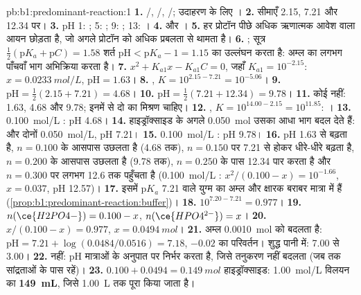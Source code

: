 \begin{solution}{pb:b1:predominant-reaction:1}
\textbf{1.} /, /,
/; उदाहरण के लिए ।
\textbf{2.} सीमाएँ 2.15, 7.21 और 12.34 पर।
\textbf{3.} pH 1: ; 5: ; 9: ; 13:
।
\textbf{4.}  और ।
\textbf{5.} हर प्रोटॉन पीछे अधिक ऋणात्मक आवेश वाला आयन छोड़ता है, जो
अगले प्रोटॉन को अधिक प्रबलता से थामता है।
\textbf{6.} ; सूत्र
$\frac12(\mathrm{p}K_a + \mathrm{p}C) = 1.58$ शर्त $\mathrm{pH} <
\mathrm{p}K_a - 1 = 1.15$ का उल्लंघन करता है: अम्ल का लगभग पाँचवाँ भाग अभिक्रिया करता है।
\textbf{7.} $x^2 + K_{a1}x - K_{a1}C = 0$, जहाँ $K_{a1} = 10^{-2.15}$: $x =
\qty{0.0233}{mol/L}$, $\mathrm{pH} = 1.63$।
\textbf{8.} , $K = 10^{2.15 - 7.21} =
10^{-5.06}$।
\textbf{9.} $\mathrm{pH} = \frac12(2.15 + 7.21) = 4.68$।
\textbf{10.} $\mathrm{pH} = \frac12(7.21 + 12.34) = 9.78$।
\textbf{11.} कोई नहीं: 1.63, 4.68 और 9.78; इनमें से दो का मिश्रण
चाहिए।
\textbf{12.} , $K = 10^{14.00 - 2.15} =
10^{11.85}$: ।
\textbf{13.} \qty{0.100}{mol/L} : pH 4.68।
\textbf{14.} हाइड्रॉक्साइड के अगले \qty{0.050}{mol} उसका आधा भाग बदल देते हैं:
 और  दोनों \qty{0.050}{mol/L}, pH 7.21।
\textbf{15.} \qty{0.100}{mol/L} : pH 9.78।
\textbf{16.} pH 1.63 से बढ़ता है, $n = 0.100$ के आसपास उछलता है (4.68 तक),
$n = 0.150$ पर 7.21 से होकर धीरे-धीरे बढ़ता है, $n = 0.200$ के आसपास उछलता है (9.78 तक),
$n = 0.250$ के पास 12.34 पार करता है और $n = 0.300$ पर लगभग 12.6 तक पहुँचता है (\qty{0.100}{mol/L} : $x^2/(0.100 - x) = 10^{-1.66}$, $x = 0.037$, pH 12.57)।
\textbf{17.} इसमें $\mathrm{p}K_a$ 7.21 वाले युग्म का अम्ल और क्षारक बराबर
मात्रा में हैं (\cref{prop:b1:predominant-reaction:buffer})।
\textbf{18.} $10^{7.20 - 7.21} = 0.977$।
\textbf{19.} $n(\ce{H2PO4-}) = 0.100 - x$, $n(\ce{HPO4^{2-}}) = x$।
\textbf{20.} $x/(0.100 - x) = 0.977$, $x = \qty{0.0494}{mol}$।
\textbf{21.} अम्ल \qty{0.0010}{mol}  को बदलता है:
$\mathrm{pH} = 7.21 + \log(0.0484/0.0516) = 7.18$, $-0.02$ का परिवर्तन।
शुद्ध पानी में: 7.00 से 3.00।
\textbf{22.} नहीं: pH मात्राओं के अनुपात पर निर्भर करता है, जिसे तनुकरण
नहीं बदलता (जब तक  सांद्रताओं के पास
रहें)।
\textbf{23.} $0.100 + 0.0494 = \qty{0.149}{mol}$ हाइड्रॉक्साइड: \qty{1.00}{mol/L}
विलयन का \textbf{\qty{149}{mL}}, जिसे \qty{1.00}{L} तक पूरा किया जाता है।
\end{solution}
